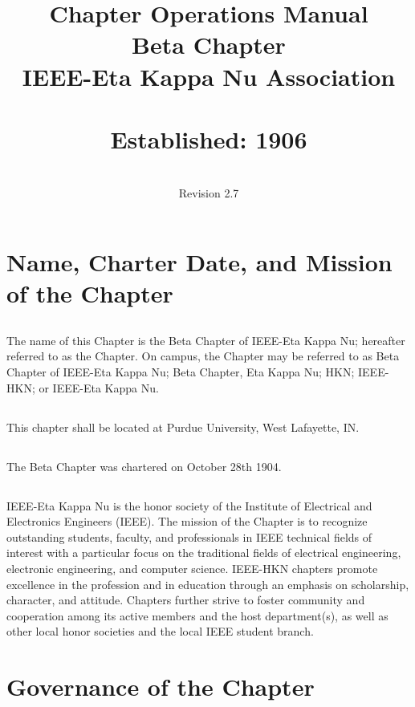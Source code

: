 \documentclass[10pt, oneside]{article}
\title{Chapter Operations Manual \\ Beta Chapter \\ IEEE-Eta Kappa Nu Association \\~\\ Established: 1906}
\author{\\Revision 2.7}
\date{}
\renewcommand{\thesection}{ARTICLE \Roman{section}}
\begin{document}
\pagestyle{fancy}
\fancyhead[R]{}
\renewcommand{\sectionmark}[1]{\markright{\MakeUppercase{\thesection. \ #1}}{}}
\renewcommand{\subsectionmark}[1]{}


\maketitle
\thispagestyle{empty}
\clearpage
\setcounter{page}{1}

\tableofcontents
\clearpage

\section{Name, Charter Date, and Mission of the Chapter}
\subsection{}
The name of this Chapter is the Beta Chapter of IEEE-Eta Kappa Nu; hereafter referred to as the Chapter. On campus, the Chapter may be referred to as Beta Chapter of IEEE-Eta Kappa Nu; Beta Chapter, Eta Kappa Nu; HKN; IEEE-HKN; or IEEE-Eta Kappa Nu.
\subsection{}
This chapter shall be located at Purdue University, West Lafayette, IN.
\subsection{}
The Beta Chapter was chartered on October 28th 1904.
\subsection{}
IEEE-Eta Kappa Nu is the honor society of the Institute of Electrical and Electronics Engineers (IEEE). The mission of the Chapter is to recognize outstanding students, faculty, and professionals in IEEE technical fields of interest with a particular focus on the traditional fields of electrical engineering, electronic engineering, and computer science. IEEE-HKN chapters promote excellence in the profession and in education through an emphasis on scholarship, character, and attitude. Chapters further strive to foster community and cooperation among its active members and the host department(s), as well as other local honor societies and the local IEEE student branch.

\section{Governance of the Chapter}
\end{document}
